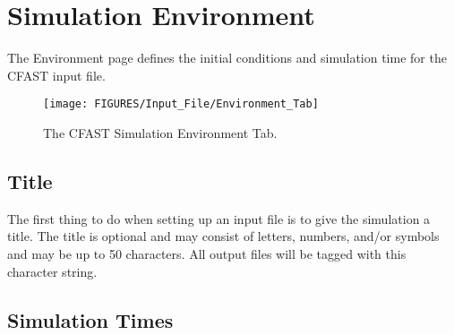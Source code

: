 \chapter{Simulation Environment}

The Environment page defines the initial conditions and simulation time for the CFAST input file.

\begin{figure}[ht]
\centering
\texttt{[image: FIGURES/Input\_File/Environment\_Tab]}
\caption[The CFAST Simulation Environment Tab]{The CFAST Simulation Environment Tab.}
\end{figure}

\section{Title}

The first thing to do when setting up an input file is to give the simulation a title. The title is optional and may consist of letters, numbers, and/or symbols and may be up to 50 characters. All output files will be tagged with this character string.


\section{Simulation Times}

